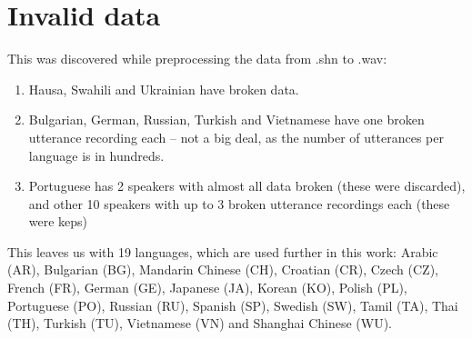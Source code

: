 \documentclass[bsc,frontabs,twoside,singlespacing,parskip,deptreport]{infthesis}
\begin{document}
{  \section{Invalid data}{
    This was discovered while preprocessing the data from .shn to .wav:
    \begin{enumerate}
      \item {Hausa, Swahili and Ukrainian have broken data.}
      \item {Bulgarian, German, Russian, Turkish and Vietnamese have one broken utterance recording each -- not a big deal, as the number of utterances per language is in hundreds.}
      \item {Portuguese has 2 speakers with almost all data broken (these were discarded), and other 10 speakers with up to 3 broken utterance recordings each (these were keps)}
    \end{enumerate}

    This leaves us with 19 languages, which are used further in this work: Arabic (AR), Bulgarian (BG), Mandarin Chinese (CH), Croatian (CR), Czech (CZ), French (FR), German (GE), Japanese (JA), Korean (KO), Polish (PL), Portuguese (PO), Russian (RU), Spanish (SP), Swedish (SW), Tamil (TA), Thai (TH), Turkish (TU), Vietnamese (VN) and Shanghai Chinese (WU).
  }
}
\end{document}
